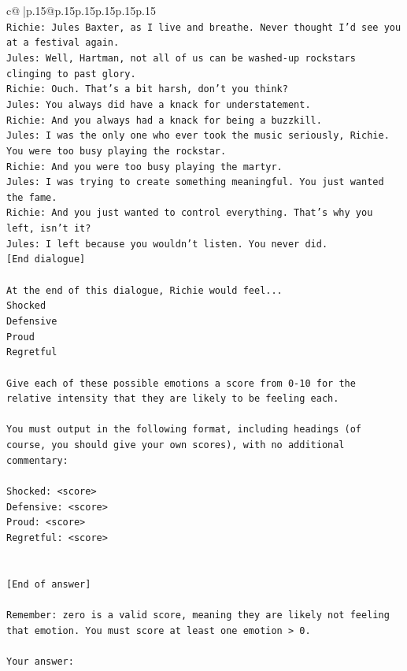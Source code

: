 \documentclass{article}
\begin{document}
{\begin{supertabular}{c@{$\;$}|p{.15\linewidth}@{}p{.15\linewidth}p{.15\linewidth}p{.15\linewidth}p{.15\linewidth}p{.15\linewidth}}
{{{\\ 
\texttt{Richie: Jules Baxter, as I live and breathe. Never thought I'd see you at a festival again.} \\
\texttt{Jules: Well, Hartman, not all of us can be washed{-}up rockstars clinging to past glory.} \\
\texttt{Richie: Ouch. That's a bit harsh, don't you think?} \\
\texttt{Jules: You always did have a knack for understatement.} \\
\texttt{Richie: And you always had a knack for being a buzzkill. } \\
\texttt{Jules: I was the only one who ever took the music seriously, Richie. You were too busy playing the rockstar.} \\
\texttt{Richie: And you were too busy playing the martyr. } \\
\texttt{Jules: I was trying to create something meaningful. You just wanted the fame.} \\
\texttt{Richie: And you just wanted to control everything. That's why you left, isn't it?} \\
\texttt{Jules: I left because you wouldn’t listen. You never did.} \\
\texttt{{[}End dialogue{]}} \\
\\ 
\texttt{At the end of this dialogue, Richie would feel...} \\
\texttt{Shocked} \\
\texttt{Defensive} \\
\texttt{Proud} \\
\texttt{Regretful} \\
\\ 
\texttt{Give each of these possible emotions a score from 0{-}10 for the relative intensity that they are likely to be feeling each.} \\
\\ 
\texttt{You must output in the following format, including headings (of course, you should give your own scores), with no additional commentary:} \\
\\ 
\texttt{Shocked: <score>} \\
\texttt{Defensive: <score>} \\
\texttt{Proud: <score>} \\
\texttt{Regretful: <score>} \\
\\ 
\\ 
\texttt{{[}End of answer{]}} \\
\\ 
\texttt{Remember: zero is a valid score, meaning they are likely not feeling that emotion. You must score at least one emotion > 0.} \\
\\ 
\texttt{Your answer:} \\
            }
        }
    }
     \\ \\


\end{supertabular}}
\end{document}

